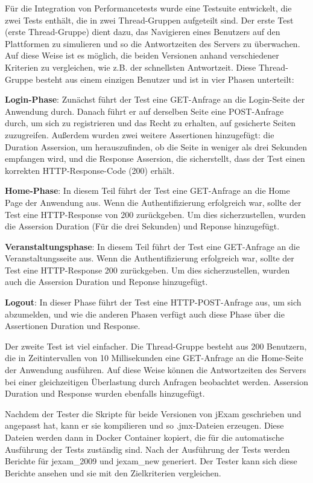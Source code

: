 Für die Integration von Performancetests wurde eine Testsuite entwickelt,
die zwei Tests enthält, die in zwei Thread-Gruppen aufgeteilt sind. Der erste
Test (erste Thread-Gruppe) dient dazu, das Navigieren eines Benutzers auf den
Plattformen zu simulieren und so die Antwortzeiten des Servers zu überwachen.
Auf diese Weise ist es möglich, die beiden Versionen anhand verschiedener
Kriterien zu vergleichen, wie z.B. der schnellsten Antwortzeit. Diese
Thread-Gruppe besteht aus einem einzigen Benutzer und ist in vier Phasen
unterteilt:


\textbf{Login-Phase}: Zunächst führt der Test eine GET-Anfrage an die Login-Seite der
Anwendung durch. Danach führt er auf derselben Seite eine POST-Anfrage durch,
um sich zu registrieren und das Recht zu erhalten, auf gesicherte Seiten
zuzugreifen. Außerdem wurden zwei weitere Assertionen hinzugefügt: die
Duration Assersion, um herauszufinden, ob die Seite in weniger als drei
Sekunden empfangen wird, und die Response Assersion, die sicherstellt,
dass der Test einen korrekten HTTP-Response-Code (200) erhält.


\textbf{Home-Phase}: In diesem Teil führt der Test eine GET-Anfrage an die Home Page
der Anwendung aus. Wenn die Authentifizierung erfolgreich war, sollte der
Test eine HTTP-Response von 200 zurückgeben. Um dies sicherzustellen, wurden
die Assersion Duration (Für die drei Sekunden) und Reponse hinzugefügt.


\textbf{Veranstaltungsphase}: In diesem Teil führt der Test eine GET-Anfrage an die
Veranstaltungsseite aus. Wenn die Authentifizierung erfolgreich war, sollte
der Test eine HTTP-Response 200 zurückgeben. Um dies sicherzustellen, wurden
auch die Assersion Duration und Reponse hinzugefügt.

\textbf{Logout}: In dieser Phase führt der Test eine HTTP-POST-Anfrage aus, um sich
abzumelden, und wie die anderen Phasen verfügt auch diese Phase über die
Assertionen Duration und Response.



Der zweite Test ist viel einfacher. Die Thread-Gruppe besteht aus 200
Benutzern, die in Zeitintervallen von 10 Millisekunden eine GET-Anfrage
an die Home-Seite der Anwendung ausführen. Auf diese Weise können die
Antwortzeiten des Servers bei einer gleichzeitigen Überlastung durch
Anfragen beobachtet werden. Assersion Duration und Response wurden ebenfalls
hinzugefügt.


Nachdem der Tester die Skripte für beide Versionen von jExam geschrieben
und angepasst hat, kann er sie kompilieren und so .jmx-Dateien erzeugen.
Diese Dateien werden dann in Docker Container kopiert, die für die
automatische Ausführung der Tests zuständig sind. Nach der Ausführung der
Tests werden Berichte für \Gls{jexam_2009} und \Gls{jexam_new} generiert. Der Tester
kann sich diese Berichte ansehen und sie mit den Zielkriterien vergleichen.

